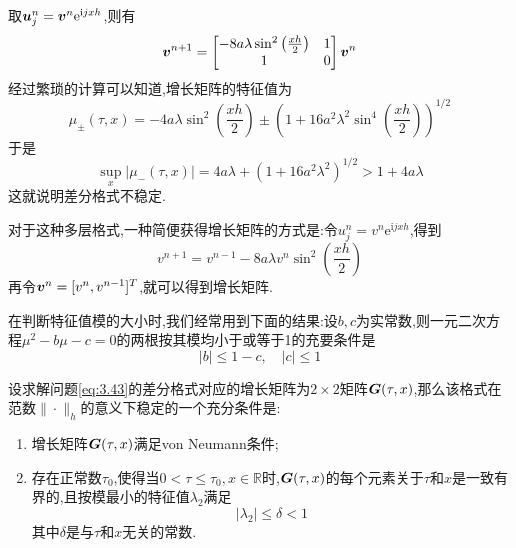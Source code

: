 取$\bm{u}^n_j=\bm{v}^n\mathrm{e}^{\mathrm{i}jxh}$,则有
$$
\bm{v}^{n+1}=
\begin{bmatrix}
    -8a\lambda\sin^2\left(\frac{xh}{2}\right) & 1\\
    1 & 0\\
\end{bmatrix}
\bm{v}^{n}
$$
经过繁琐的计算可以知道,增长矩阵的特征值为
$$
\mu_{\pm}(\tau,x)=-4a\lambda\sin^2\left(\frac{xh}{2}\right)\pm \left(1+16a^2\lambda^2\sin^4\left(\frac{xh}{2}\right)\right)^{1/2}
$$
于是
$$
\sup_{x}|\mu_{-}(\tau,x)|=4a\lambda+(1+16a^2\lambda^2)^{1/2}>1+4a\lambda
$$
这就说明差分格式不稳定.\par
对于这种多层格式,一种简便获得增长矩阵的方式是:令$u^{n}_j=v^n\mathrm{e}^{\mathrm{i}jxh}$,得到
$$
v^{n+1}=v^{n-1}-8a\lambda v^n\sin^2\left(\frac{xh}{2}\right)
$$
再令$\bm{v}^n=[v^n,v^{n-1}]^T$,就可以得到增长矩阵.\par
在判断特征值模的大小时,我们经常用到下面的结果:设$b,c$为实常数,则一元二次方程$\mu^2-b\mu-c=0$的两根按其模均小于或等于1的充要条件是
$$
|b|\leqslant 1-c,\quad |c|\leqslant 1
$$
\begin{Theorem}{}
    设求解问题\eqref{eq:3.43}的差分格式对应的增长矩阵为$2\times 2$矩阵$\bm{G}(\tau,x)$,那么该格式在范数$\|\cdot\|_h$的意义下稳定的一个充分条件是:
    \begin{enumerate}[nosep,label = \roman*)]
        \item 增长矩阵$\bm{G}(\tau,x)$满足von Neumann条件;
        \item 存在正常数$\tau_0$,使得当$0<\tau\leqslant \tau_0,x\in\mathbb{R}$时,$\bm{G}(\tau,x)$的每个元素关于$\tau$和$x$是一致有界的,且按模最小的特征值$\lambda_2$满足
        $$
            |\lambda_2|\leqslant \delta<1
        $$
        其中$\delta$是与$\tau$和$x$无关的常数.
    \end{enumerate}
\end{Theorem}


